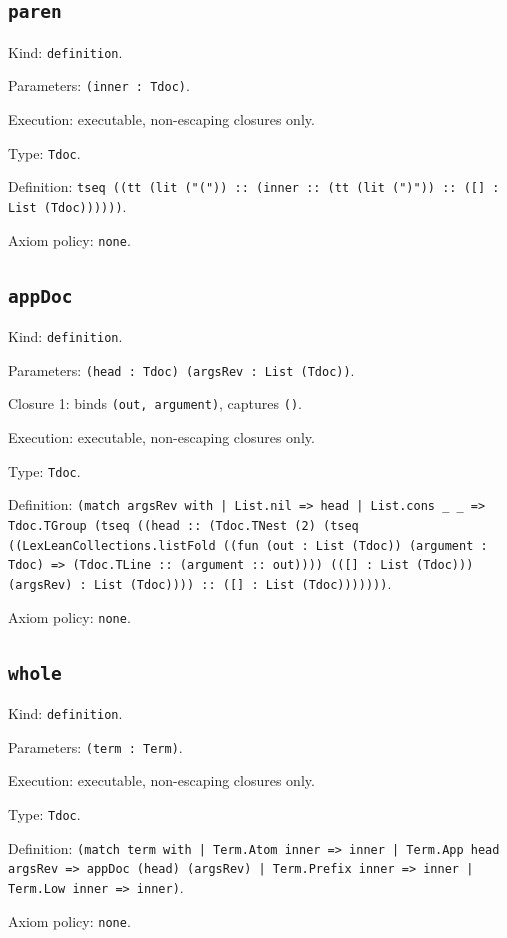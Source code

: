 \documentclass[11pt]{article}
\begin{document}
\subsection*{\texttt{paren}}
\noindent Kind: \texttt{definition}.\par
\noindent Parameters: \texttt{(inner : Tdoc)}.\par
\noindent Execution: executable, non-escaping closures only.\par
\noindent Type: \texttt{Tdoc}.\par
\noindent Definition: \texttt{tseq ((tt (lit ("(")) :: (inner :: (tt (lit (")")) :: ([] : List (Tdoc))))))}.\par
\noindent Axiom policy: \texttt{none}.\par
\subsection*{\texttt{appDoc}}
\noindent Kind: \texttt{definition}.\par
\noindent Parameters: \texttt{(head : Tdoc) (argsRev : List (Tdoc))}.\par
\noindent Closure 1: binds \texttt{(out, argument)}, captures \texttt{()}.\par
\noindent Execution: executable, non-escaping closures only.\par
\noindent Type: \texttt{Tdoc}.\par
\noindent Definition: \texttt{(match argsRev with | List.nil => head | List.cons \_ \_ => Tdoc.TGroup (tseq ((head :: (Tdoc.TNest (2) (tseq ((LexLeanCollections.listFold ((fun (out : List (Tdoc)) (argument : Tdoc) => (Tdoc.TLine :: (argument :: out)))) (([] : List (Tdoc))) (argsRev) : List (Tdoc)))) :: ([] : List (Tdoc)))))))}.\par
\noindent Axiom policy: \texttt{none}.\par
\subsection*{\texttt{whole}}
\noindent Kind: \texttt{definition}.\par
\noindent Parameters: \texttt{(term : Term)}.\par
\noindent Execution: executable, non-escaping closures only.\par
\noindent Type: \texttt{Tdoc}.\par
\noindent Definition: \texttt{(match term with | Term.Atom inner => inner | Term.App head argsRev => appDoc (head) (argsRev) | Term.Prefix inner => inner | Term.Low inner => inner)}.\par
\noindent Axiom policy: \texttt{none}.\par
\end{document}
